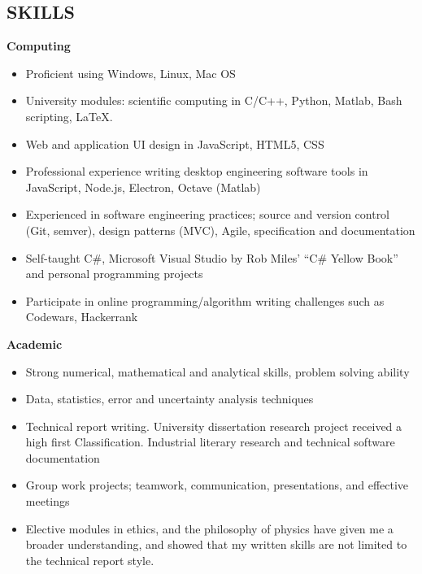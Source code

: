 \documentclass[margin, line, 10pt]{res} %
\begin{document}
\begin{resume}
 
\section{SKILLS}



\textbf{Computing}  
\begin{itemize} 
\item Proficient using Windows, Linux, Mac OS
\item University modules: scientific computing in C/C++, Python, Matlab, Bash scripting, LaTeX.
\item Web and application UI design in JavaScript, HTML5, CSS

\item Professional experience writing desktop engineering software tools in JavaScript, Node.js, Electron, Octave (Matlab)

\item Experienced in software engineering practices; source and version control (Git, semver), design patterns (MVC), Agile, specification and documentation

\item Self-taught C\#, Microsoft Visual Studio by Rob Miles' ``C\# Yellow Book'' and personal programming projects

\item Participate in online programming/algorithm writing challenges such as Codewars, Hackerrank
\end{itemize}



\textbf{Academic}  
\begin{itemize}
\item Strong numerical, mathematical and analytical skills, problem solving ability 

\item Data, statistics, error and uncertainty analysis techniques

\item Technical report writing. University dissertation research project received a high first Classification. Industrial literary research and technical software documentation

\item Group work projects; teamwork, communication, presentations, and effective meetings

\item Elective modules in ethics, and the philosophy of physics have given me a broader understanding, and showed that my written skills are not limited to the technical report style.
\end{itemize}




\end{resume}
\end{document}

